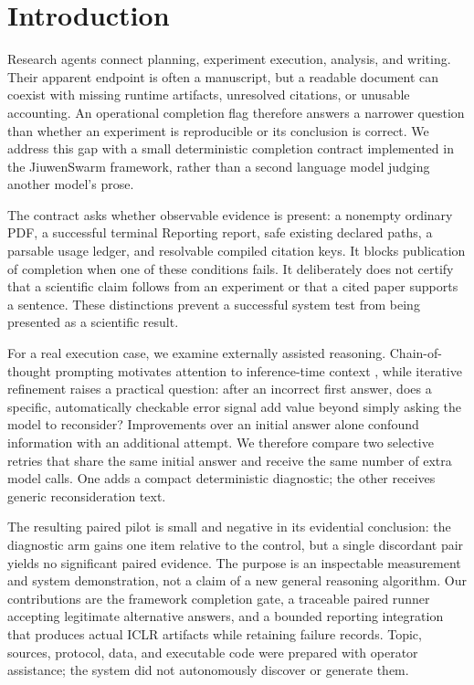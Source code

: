 \section{Introduction}
Research agents connect planning, experiment execution, analysis, and writing. Their apparent endpoint is often a manuscript, but a readable document can coexist with missing runtime artifacts, unresolved citations, or unusable accounting. An operational completion flag therefore answers a narrower question than whether an experiment is reproducible or its conclusion is correct. We address this gap with a small deterministic completion contract implemented in the JiuwenSwarm framework, rather than a second language model judging another model's prose.

The contract asks whether observable evidence is present: a nonempty ordinary PDF, a successful terminal Reporting report, safe existing declared paths, a parsable usage ledger, and resolvable compiled citation keys. It blocks publication of completion when one of these conditions fails. It deliberately does not certify that a scientific claim follows from an experiment or that a cited paper supports a sentence. These distinctions prevent a successful system test from being presented as a scientific result.

For a real execution case, we examine externally assisted reasoning. Chain-of-thought prompting motivates attention to inference-time context \citep{jason20224a94a8d1}, while iterative refinement raises a practical question: after an incorrect first answer, does a specific, automatically checkable error signal add value beyond simply asking the model to reconsider? Improvements over an initial answer alone confound information with an additional attempt. We therefore compare two selective retries that share the same initial answer and receive the same number of extra model calls. One adds a compact deterministic diagnostic; the other receives generic reconsideration text.

The resulting paired pilot is small and negative in its evidential conclusion: the diagnostic arm gains one item relative to the control, but a single discordant pair yields no significant paired evidence. The purpose is an inspectable measurement and system demonstration, not a claim of a new general reasoning algorithm. Our contributions are the framework completion gate, a traceable paired runner accepting legitimate alternative answers, and a bounded reporting integration that produces actual ICLR artifacts while retaining failure records. Topic, sources, protocol, data, and executable code were prepared with operator assistance; the system did not autonomously discover or generate them.
